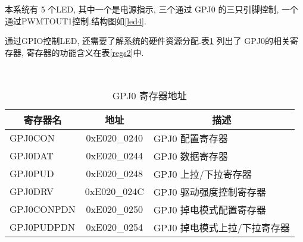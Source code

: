 	本系统有 5 个LED, 其中一个是电源指示, 三个通过 GPJ0 的三只引脚控制,
一个通过PWMTOUT1控制.结构图如\ref{led4}.

	通过GPIO控制LED, 还需要了解系统的硬件资源分配.表{}\ref{regs1} 列出了
GPJ0的相关寄存器, 寄存器的功能含义在表{}\ref{regs2}中.
	
\begin{table}[!h]
\centering
\caption{GPJ0 寄存器地址}\label{regs1} \ \\

\begin{tabular}{|l|c|l|}
\hline
\multicolumn{1}{|c|}{寄存器名} & 地址 & 
\multicolumn{1}{c|}{描述} \\\hline
	GPJ0CON   & 0xE020\_0240 & GPJ0 配置寄存器              \\\hline
	GPJ0DAT   & 0xE020\_0244 & GPJ0 数据寄存器              \\\hline
	GPJ0PUD   & 0xE020\_0248 & GPJ0 上拉/下拉寄存器         \\\hline
	GPJ0DRV   & 0xE020\_024C & GPJ0 驱动强度控制寄存器      \\\hline
	GPJ0CONPDN& 0xE020\_0250 & GPJ0 掉电模式配置寄存器      \\\hline
	GPJ0PUDPDN& 0xE020\_0254 & GPJ0 掉电模式上拉/下拉寄存器 \\\hline
\end{tabular}
\end{table}


